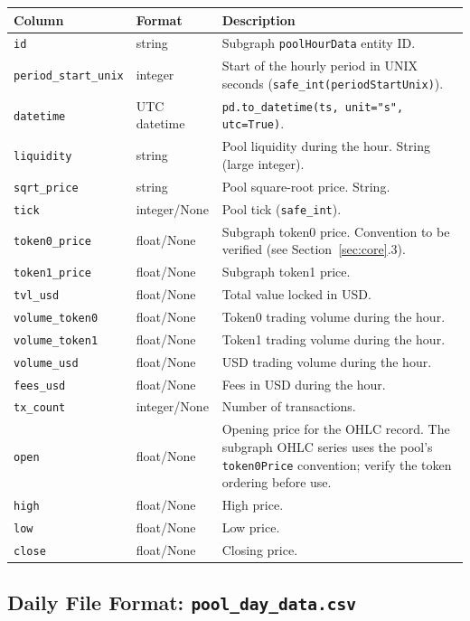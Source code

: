\documentclass[11pt,a4paper]{article}
\begin{document}
\begin{xltabular}{\linewidth}{L{4.2cm}L{3.0cm}Y}
\toprule
\textbf{Column} & \textbf{Format} & \textbf{Description} \\
\midrule
\texttt{id} & string & Subgraph \texttt{poolHourData} entity ID. \\
\texttt{period\_start\_unix} & integer & Start of the hourly period in
  UNIX seconds (\texttt{safe\_int(periodStartUnix)}). \\
\texttt{datetime} & UTC datetime & \texttt{pd.to\_datetime(ts, unit="s",
  utc=True)}. \\
\texttt{liquidity} & string & Pool liquidity during the hour. String
  (large integer). \\
\texttt{sqrt\_price} & string & Pool square-root price. String. \\
\texttt{tick} & integer/None & Pool tick (\texttt{safe\_int}). \\
\texttt{token0\_price} & float/None & Subgraph token0 price. Convention
  to be verified (see Section~\ref{sec:core}.3). \\
\texttt{token1\_price} & float/None & Subgraph token1 price. \\
\texttt{tvl\_usd} & float/None & Total value locked in USD. \\
\texttt{volume\_token0} & float/None & Token0 trading volume during the
  hour. \\
\texttt{volume\_token1} & float/None & Token1 trading volume during the
  hour. \\
\texttt{volume\_usd} & float/None & USD trading volume during the hour. \\
\texttt{fees\_usd} & float/None & Fees in USD during the hour. \\
\texttt{tx\_count} & integer/None & Number of transactions. \\
\texttt{open} & float/None & Opening price for the OHLC record. The
  subgraph OHLC series uses the pool's \texttt{token0Price} convention;
  verify the token ordering before use. \\
\texttt{high} & float/None & High price. \\
\texttt{low} & float/None & Low price. \\
\texttt{close} & float/None & Closing price. \\
\bottomrule
\end{xltabular}

\subsection{Daily File Format: \texttt{pool\_day\_data.csv}}
\end{document}
